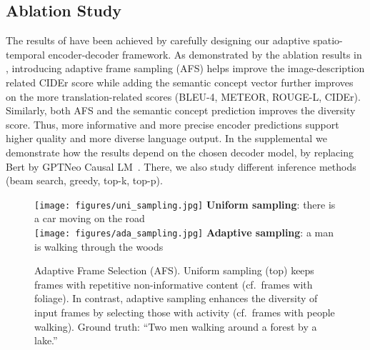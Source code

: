 \documentclass[runningheads,table]{llncs}
\begin{document}
\subsection{Ablation Study}
The results of  have been achieved by carefully designing our adaptive spatio-temporal encoder-decoder framework. 
As demonstrated by the ablation results in , introducing adaptive frame sampling (AFS) helps improve the image-description related CIDEr score while adding the semantic concept vector further improves on the more translation-related scores (BLEU-4, METEOR, ROUGE-L, CIDEr).
Similarly, both AFS and the semantic concept prediction improves the diversity score. Thus, more informative and more precise encoder predictions support higher quality and more diverse language output. In the supplemental we demonstrate how the results depend on the chosen decoder model, by replacing Bert by GPTNeo Causal LM~\cite{black2021gpt,radford2018improving}. There, we also study different inference methods (beam search, greedy, top-k, top-p).





\begin{figure*}[ht]
    \centering

    {\centering 
    \texttt{[image: figures/uni\_sampling.jpg]} 
    }
    \scriptsize{ 
        \vspace{-.4cm}
        \textbf{Uniform sampling}: there is a car moving on the road} \\
     {\centering 
     \vspace{0.4cm}
    \texttt{[image: figures/ada\_sampling.jpg]} 
    }
    \scriptsize{ 
          \vspace{-.4cm}
        \textbf{Adaptive sampling}: a man is walking through the woods}\\
        
    \vspace{1ex}
    \caption{Adaptive Frame Selection (AFS). Uniform sampling (top) keeps frames with repetitive non-informative content (cf.\ frames with foliage).
    In contrast, adaptive sampling enhances the diversity of input frames by selecting those with activity (cf.\ frames with people walking). Ground truth: \enquote{Two men walking around a forest by a lake.}
}\label{fig:AFSEffect}
\end{figure*}
\end{document}
